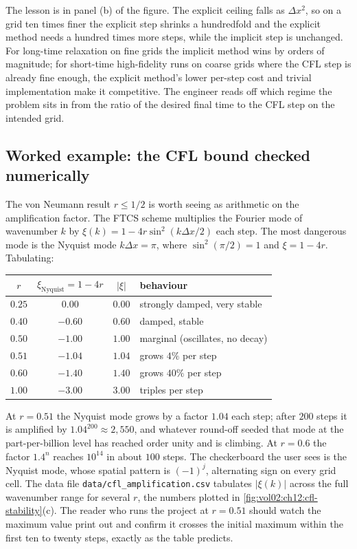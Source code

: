 The lesson is in panel (b) of the figure. The explicit ceiling
falls as $\Delta x^{2}$, so on a grid ten times finer the explicit
step shrinks a hundredfold and the explicit method needs a hundred
times more steps, while the implicit step is unchanged. For
long-time relaxation on fine grids the implicit method wins by
orders of magnitude; for short-time high-fidelity runs on coarse
grids where the CFL step is already fine enough, the explicit
method's lower per-step cost and trivial implementation make it
competitive. The engineer reads off which regime the problem sits
in from the ratio of the desired final time to the CFL step on the
intended grid.



\subsection{Worked example: the CFL bound checked numerically}

The von Neumann result $r \leq 1/2$ is worth seeing as arithmetic
on the amplification factor. The FTCS scheme multiplies the Fourier
mode of wavenumber $k$ by $\xi(k) = 1 - 4 r \sin^{2}(k\Delta x/2)$
each step. The most dangerous mode is the Nyquist mode $k\Delta x =
\pi$, where $\sin^{2}(\pi/2) = 1$ and $\xi = 1 - 4r$. Tabulating:

\begin{center}
\begin{tabular}{cccl}
\toprule
$r$ & $\xi_{\text{Nyquist}} = 1 - 4r$ & $|\xi|$ & behaviour \\
\midrule
$0.25$ & $0.00$  & $0.00$ & strongly damped, very stable \\
$0.40$ & $-0.60$ & $0.60$ & damped, stable \\
$0.50$ & $-1.00$ & $1.00$ & marginal (oscillates, no decay) \\
$0.51$ & $-1.04$ & $1.04$ & grows $4\%$ per step \\
$0.60$ & $-1.40$ & $1.40$ & grows $40\%$ per step \\
$1.00$ & $-3.00$ & $3.00$ & triples per step \\
\bottomrule
\end{tabular}
\end{center}

At $r = 0.51$ the Nyquist mode grows by a factor $1.04$ each step;
after $200$ steps it is amplified by $1.04^{200} \approx 2{,}550$,
and whatever round-off seeded that mode at the part-per-billion
level has reached order unity and is climbing. At $r = 0.6$ the
factor $1.4^{n}$ reaches $10^{14}$ in about $100$ steps. The
checkerboard the user sees is the Nyquist mode, whose spatial
pattern is $(-1)^{j}$, alternating sign on every grid cell. The
data file \texttt{data/cfl\_amplification.csv} tabulates $|\xi(k)|$
across the full wavenumber range for several $r$, the numbers
plotted in \cref{fig:vol02:ch12:cfl-stability}(c). The reader who
runs the project at $r = 0.51$ should watch the maximum value print
out and confirm it crosses the initial maximum within the first ten
to twenty steps, exactly as the table predicts.

